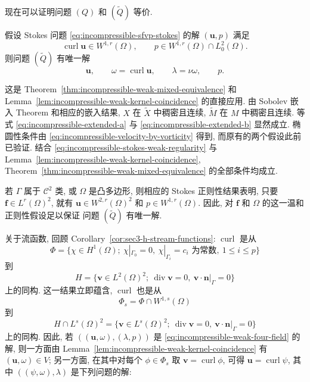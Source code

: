 {现在可以证明问题 $(Q)$ 和 $(\widetilde Q)$ 等价.

\begin{Theorem}\label{thm:incompressible-weak-four-field-equivalence}
假设 Stokes 问题
\eqref{eq:incompressible-sfvp-stokes} 的解 $(\mathbf u,p)$ 满足
\begin{equation}\label{eq:incompressible-stokes-weak-regularity}
\operatorname{curl}\mathbf u\in W^{1,r}(\Omega),
\qquad
p\in W^{1,r}(\Omega)\cap L_0^2(\Omega).
\end{equation}
则问题 $(\widetilde Q)$ 有唯一解
\[
\mathbf u,\qquad
\omega=\operatorname{curl}\mathbf u,\qquad
\lambda=\nu\omega,\qquad
p.
\]
\end{Theorem}

\begin{Proof}
这是 Theorem~\ref{thm:incompressible-weak-mixed-equivalence}
和 Lemma~\ref{lem:incompressible-weak-kernel-coincidence}
的直接应用.
由 Sobolev 嵌入 Theorem 和相应的嵌入结果,
$X$ 在 $\widetilde X$ 中稠密且连续,
$\widetilde M$ 在 $M$ 中稠密且连续.
等式
\eqref{eq:incompressible-extended-a}
与 \eqref{eq:incompressible-extended-b} 显然成立.
椭圆性条件由
\eqref{eq:incompressible-velocity-by-vorticity} 得到,
而原有的两个假设此前已验证.
结合
\eqref{eq:incompressible-stokes-weak-regularity}
与 Lemma~\ref{lem:incompressible-weak-kernel-coincidence},
Theorem~\ref{thm:incompressible-weak-mixed-equivalence}
的全部条件均成立.
\end{Proof}

\begin{Remark}\label{rem:incompressible-weak-regularity-sufficient}
若 $\Gamma$ 属于 $\mathcal C^2$ 类,
或 $\Omega$ 是凸多边形,
则相应的 Stokes 正则性结果表明,
只要 $\mathbf f\in L^r(\Omega)^2$, 就有
$\mathbf u\in W^{2,r}(\Omega)^2$ 和
$p\in W^{1,r}(\Omega)$.
因此, 对 $\mathbf f$ 和 $\Omega$ 的这一温和正则性假设足以保证
问题 $(\widetilde Q)$ 有唯一解.
\end{Remark}

关于流函数, 回顾
Corollary~\ref{cor:sec3-h-stream-functions}:
$\operatorname{curl}$ 是从
\[
\Phi=\{\chi\in H^1(\Omega);\
\chi|_{\Gamma_0}=0,\
\chi|_{\Gamma_i}=c_i\text{ 为常数},\
1\leq i\leq p\}
\]
到
\[
H=\{\mathbf v\in L^2(\Omega)^2;\
\operatorname{div}\mathbf v=0,\
\mathbf v\cdot\mathbf n|_\Gamma=0\}
\]
上的同构.
这一结果立即蕴含,
$\operatorname{curl}$ 也是从
\begin{equation}\label{eq:incompressible-stream-space-phi-s}
\Phi_s=\Phi\cap W^{1,s}(\Omega)
\end{equation}
到
\[
H\cap L^s(\Omega)^2
=\{\mathbf v\in L^s(\Omega)^2;\
\operatorname{div}\mathbf v=0,\
\mathbf v\cdot\mathbf n|_\Gamma=0\}
\]
上的同构.
因此, 若 $((\mathbf u,\omega),(\lambda,p))$
是 \eqref{eq:incompressible-weak-four-field} 的解,
则一方面由
Lemma~\ref{lem:incompressible-weak-kernel-coincidence}
有 $(\mathbf u,\omega)\in V$;
另一方面, 在其中对每个 $\phi\in\Phi_s$
取 $\mathbf v=\operatorname{curl}\phi$, 可得
$\mathbf u=\operatorname{curl}\psi$, 其中
$((\psi,\omega),\lambda)$ 是下列问题的解:

}
